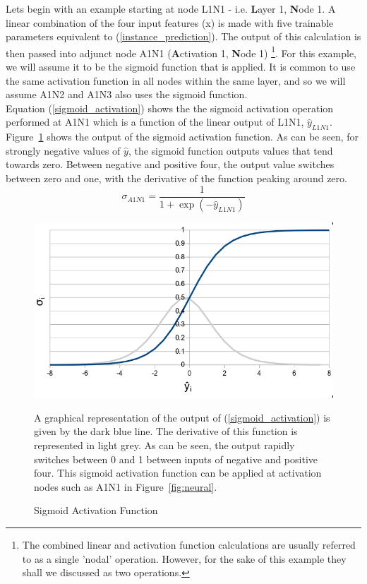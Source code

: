 \noindent
Lets begin with an example starting at node L1N1 - i.e. \textbf{L}ayer 1, \textbf{N}ode 1. A linear combination of the four input features (x) is made with five trainable parameters equivalent to (\ref{instance_prediction}). The output of this calculation is then passed into adjunct node A1N1 (\textbf{A}ctivation 1, \textbf{N}ode 1) \footnote{The combined linear and activation function calculations are usually referred to as a single 'nodal' operation. However, for the sake of this example they shall we discussed as two operations.}. For this example, we will assume it to be the sigmoid function \cite{pratiwi2020sigmoid} that is applied. It is common to use the same activation function in all nodes within the same layer, and so we will assume A1N2 and A1N3 also uses the sigmoid function.\\

\noindent
Equation (\ref{sigmoid_activation}) shows the the sigmoid activation operation performed at A1N1 which is a function of the linear output of L1N1, $\hat{y}_{L1N1}$.  Figure~\ref{fig:sigmoid} shows the output of the sigmoid activation function. As can be seen, for strongly negative values of $\hat{y}$, the sigmoid function outputs values that tend towards zero. Between negative and positive four, the output value switches between zero and one, with the derivative of the function peaking around zero. \\ 

\begin{equation} \label{sigmoid_activation}
	\sigma_{A1N1} = \frac{1}{1 + \exp(-\hat{y}_{L1N1})}
\end{equation}

\begin{figure}[p]
	\centering
	\includegraphics[scale=0.5]{Figures/Sigmoid.jpg}
	\caption{Sigmoid Activation Function} {A graphical representation of the output of (\ref{sigmoid_activation}) is given by the dark blue line. The derivative of this function is represented in light grey. As can be seen, the output rapidly switches between 0 and 1 between inputs of negative and positive four. This sigmoid activation function can be applied at activation nodes such as A1N1 in Figure~\ref{fig:neural}. }
	\label{fig:sigmoid}
\end{figure}

